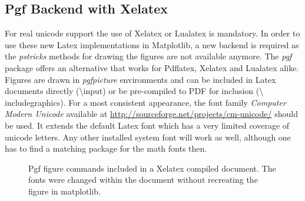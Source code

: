 \documentclass[12pt, a4paper]{article}
\begin{document}
\newpage
\subsection*{Pgf Backend with Xelatex}

For real unicode support the use of Xelatex or Lualatex is mandatory. In order to use these new Latex implementations in Matplotlib, a new backend is required as the \textit{pstricks} methods for drawing the figures are not available anymore. The \textit{pgf} package offers an alternative that works for Pdflatex, Xelatex and Lualatex alike. Figures are drawn in \textit{pgfpicture} environments and can be included in Latex documents directly (\textbackslash input) or be pre-compiled to PDF for inclusion (\textbackslash
 includegraphics). For a most consistent appearance, the font family \textit{Computer Modern Unicode} available at \url{http://sourceforge.net/projects/cm-unicode/} should be used. It extends the default Latex font which has a very limited coverage of unicode letters. Any other installed system font will work as well, although one has to find a matching package for the math fonts then.

\begin{figure}[h]
\hspace{1mm}
\caption{Pgf figure commands included in a Xelatex compiled document. The fonts were changed within the document without recreating the figure in matplotlib.}
\end{figure}
\end{document}
